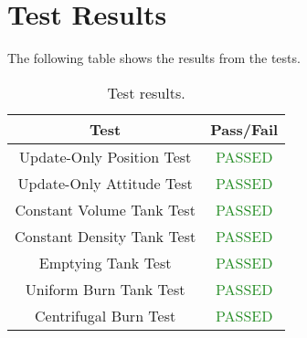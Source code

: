 \section{Test Results}

The following table shows the results from the tests.

\begin{table}[htbp]
	\caption{Test results.}
	\label{tab:results}
	\centering \fontsize{10}{10}\selectfont
	\begin{tabular}{c | c } %
		\hline
		\textbf{Test} 				    & \textbf{Pass/Fail}  \\ \hline
		Update-Only Position Test  & \textcolor{ForestGreen}{PASSED}\\
		Update-Only Attitude Test  & \textcolor{ForestGreen}{PASSED}   \\ 
		Constant Volume Tank Test  &\textcolor{ForestGreen}{PASSED}  \\ 
		Constant Density Tank Test &\textcolor{ForestGreen}{PASSED}  \\ 
		Emptying Tank Test &\textcolor{ForestGreen}{PASSED}  \\ 
		Uniform Burn Tank Test  &\textcolor{ForestGreen}{PASSED}  \\ 
		Centrifugal Burn Test &\textcolor{ForestGreen}{PASSED}  \\ \hline
	\end{tabular}
\end{table}

\clearpage